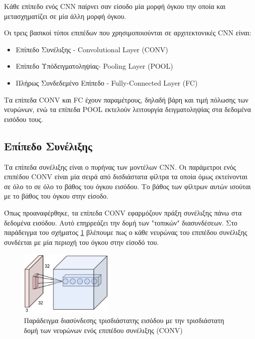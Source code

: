 Κάθε επίπεδο ενός CNN παίρνει σαν είσοδο μία μορφή όγκου την οποία
και μετασχηματίζει σε μία άλλη μορφή όγκου.

Οι τρεις βασικοί τύποι επιπέδων που χρησιμοποιούνται σε αρχιτεκτονικές CNN είναι:
\begin{itemize}
  \item{Επίπεδο Συνέλιξης - Convolutional Layer (CONV)}
  \item{Επίπεδο Υπόδειγματοληψίας- Pooling Layer (POOL)}
  \item{Πλήρως Συνδεδεμένο Επίπεδο - Fully-Connected Layer (FC)}
\end{itemize}
Τα επίπεδα CONV και FC έχουν παραμέτρους, δηλαδή
βάρη και τιμή πόλωσης των νευρώνων, ενώ τα επίπεδα POOL εκτελούν λειτουργία
δειγματοληψίας στα δεδομένα εισόδου τους.

\subsection{Επίπεδο Συνέλιξης}

Τα επίπεδα συνέλιξης είναι ο πυρήνας των μοντέλων CNN. Οι παράμετροι ενός
επιπέδου CONV είναι μία σειρά από δισδιάστατα φίλτρα τα οποία όμως εκτείνονται
σε όλο το σε όλο το βάθος του όγκου εισόδου. Το βάθος των φίλτρων αυτών
ισούται με το βάθος του όγκου στην είσοδο.

Όπως προαναφέρθηκε, τα επίπεδα CONV εφαρμόζουν πράξη συνέλιξης πάνω στα
δεδομένα εισόδου. Αυτό επηρρεάζει την δομή των "τοπικών" διασυνδέσεων.
Στο παράδειγμα του σχήματος \ref{fig:cnn_2} βλέπουμε πως ο κάθε νευρώνας
του επιπέδου συνέλιξης συνδέεται με μία περιοχή του όγκου στην είσοδό του.

\begin{figure}[!ht]
  \centering
  \includegraphics[width=0.4\textwidth]{./images/chapter3/cnn_2.jpg}
  \caption[%
    Παράδειγμα διασύνδεσης τρισδιάστατης εισόδου με την τρισδιάστατη δομή των
    νευρώνων ενός επιπέδου συνέλιξης (CONV)]{%
    Παράδειγμα διασύνδεσης τρισδιάστατης εισόδου με την τρισδιάστατη δομή των
    νευρώνων ενός επιπέδου συνέλιξης (CONV)}
  \label{fig:cnn_2}
\end{figure}

